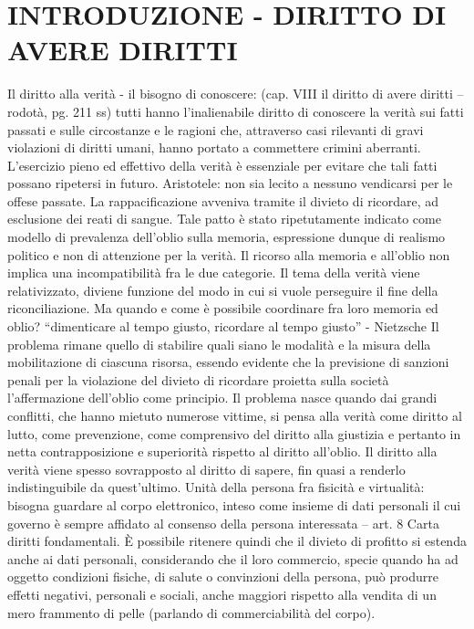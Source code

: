 \section{INTRODUZIONE - DIRITTO DI AVERE DIRITTI}
Il diritto alla verità - il bisogno di conoscere: (cap. VIII il diritto di avere diritti – rodotà, pg. 211 ss)
tutti hanno l’inalienabile diritto di conoscere la verità sui fatti passati e sulle circostanze e le ragioni che, attraverso casi rilevanti di gravi violazioni di diritti umani, hanno portato a commettere crimini aberranti. L’esercizio pieno ed effettivo della verità è essenziale per evitare che tali fatti possano ripetersi in futuro.
Aristotele: non sia lecito a nessuno vendicarsi per le offese passate. La rappacificazione avveniva tramite il divieto di ricordare, ad esclusione dei reati di sangue.
Tale patto è stato ripetutamente indicato come modello di prevalenza dell’oblio sulla memoria, espressione dunque di realismo politico e non di attenzione per la verità. Il ricorso alla memoria e all’oblio non implica una incompatibilità fra le due categorie. Il tema della verità viene relativizzato, diviene funzione del modo in cui si vuole perseguire il fine della riconciliazione. Ma quando e come è possibile coordinare fra loro memoria ed oblio?
“dimenticare al tempo giusto, ricordare al tempo giusto”  - Nietzsche
Il problema rimane quello di stabilire quali siano le modalità e la misura della mobilitazione di ciascuna risorsa, essendo evidente che la previsione di sanzioni penali per la violazione del divieto di ricordare proietta sulla società l’affermazione dell’oblio come principio.
Il problema nasce quando dai grandi conflitti, che hanno mietuto numerose vittime, si pensa alla verità come diritto al lutto, come prevenzione, come comprensivo del diritto alla giustizia e pertanto in netta contrapposizione e superiorità rispetto al diritto all’oblio. Il diritto alla verità viene spesso sovrapposto al diritto di sapere, fin quasi a renderlo indistinguibile da quest’ultimo. 
Unità della persona fra fisicità e virtualità:
bisogna guardare al corpo elettronico, inteso come insieme di dati personali il cui governo è sempre affidato al consenso della persona interessata – art. 8 Carta diritti fondamentali.
È possibile ritenere quindi che il divieto di profitto si estenda anche ai dati personali, considerando che il loro commercio, specie quando ha ad oggetto condizioni fisiche, di salute o convinzioni della persona, può produrre effetti negativi, personali e sociali, anche maggiori rispetto alla vendita di un mero frammento di pelle (parlando di commerciabilità del corpo).
